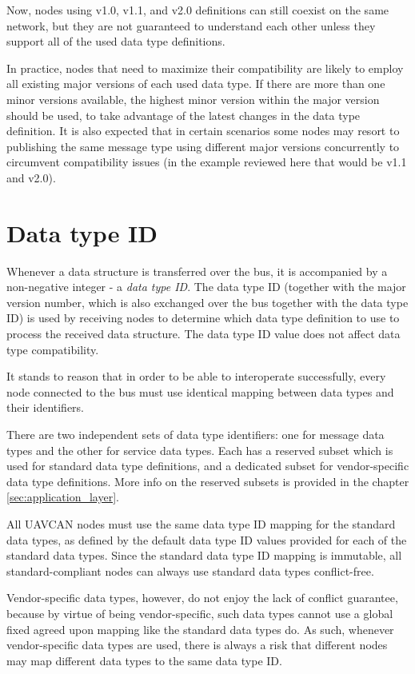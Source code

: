 Now, nodes using v1.0, v1.1, and v2.0 definitions can still coexist on the same network,
but they are not guaranteed to understand each other unless they support all of the used data type definitions.

In practice, nodes that need to maximize their compatibility are likely to employ all existing major versions of
each used data type.
If there are more than one minor versions available, the highest minor version within the major version should
be used, to take advantage of the latest changes in the data type definition.
It is also expected that in certain scenarios some nodes may resort to publishing the same message type
using different major versions concurrently to circumvent compatibility issues (in the
example reviewed here that would be v1.1 and v2.0).

\section{Data type ID}

Whenever a data structure is transferred over the bus, it is accompanied by a non-negative integer
- a \emph{data type ID}.
The data type ID (together with the major version number, which is also exchanged over the bus together with the
data type ID) is used by receiving nodes to determine which data type definition to use
to process the received data structure.
The data type ID value does not affect data type compatibility.

It stands to reason that in order to be able to interoperate successfully,
every node connected to the bus must use identical mapping between data types and their identifiers.

There are two independent sets of data type identifiers:
one for message data types and the other for service data types.
Each has a reserved subset which is used for standard data type definitions,
and a dedicated subset for vendor-specific data type definitions.
More info on the reserved subsets is provided in the chapter \ref{sec:application_layer}.

All UAVCAN nodes must use the same data type ID mapping for the standard data types,
as defined by the default data type ID values provided for each of the standard data types.
Since the standard data type ID mapping is immutable, all standard-compliant nodes can always
use standard data types conflict-free.

Vendor-specific data types, however, do not enjoy the lack of conflict guarantee,
because by virtue of being vendor-specific, such data types cannot use a global
fixed agreed upon mapping like the standard data types do.
As such, whenever vendor-specific data types are used, there is always a risk that
different nodes may map different data types to the same data type ID.


